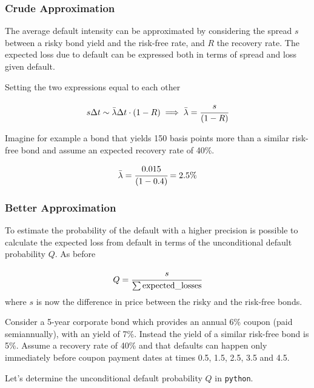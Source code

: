 \subsubsection{Crude Approximation}

The average default intensity can be approximated by considering the spread $s$ between a risky bond yield and the risk-free rate, and $R$ the recovery rate.
The expected loss due to default can be expressed both in terms of spread and loss given default. 


Setting the two expressions equal to each other

\begin{equation}
s \Delta t \sim \bar{\lambda}\Delta t\cdot(1-R) \implies \bar{\lambda} = \cfrac{s}{(1-R)}
\end{equation}

Imagine for example a bond that yields 150 basis points more than a similar risk-free bond and assume an expected recovery rate of 40\%.

\begin{equation*}
\bar{\lambda} = \cfrac{0.015}{(1-0.4)} = 2.5\%
\end{equation*}

\subsubsection{Better Approximation}

To estimate the probability of the default with a higher precision is possible to calculate the expected loss from default in terms of the unconditional default probability $Q$. As before

\begin{equation}
Q = \cfrac{s}{\sum\mathrm{expected\_losses}}
\end{equation}
where $s$ is now the difference in price between the risky and the risk-free bonds.

Consider a 5-year corporate bond which provides an annual 6\% coupon (paid semiannually), with an yield of 7\%. Instead the yield of a similar risk-free bond is 5\%. Assume a recovery rate of 40\% and that defaults can happen only immediately before coupon payment dates at times 0.5, 1.5, 2.5, 3.5 and 4.5. 

Let's determine the unconditional default probability $Q$ in \texttt{python}.

